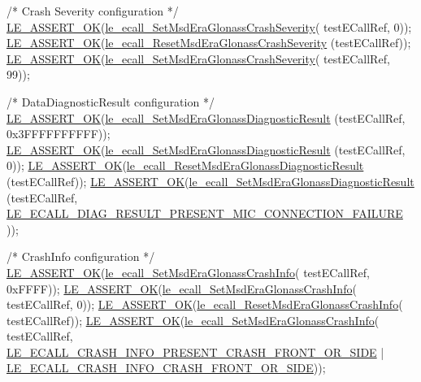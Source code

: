 \begin{DoxyCodeInclude}
    \textcolor{comment}{/* Crash Severity configuration */}
    \hyperlink{le__log_8h_a7cd2daa3d4af1de4d29e0eed95187484}{LE\_ASSERT\_OK}(\hyperlink{le__ecall__interface_8h_a577f3dcd16e53c8a14295ec58c6d2b9a}{le\_ecall\_SetMsdEraGlonassCrashSeverity}(
      testECallRef, 0));
    \hyperlink{le__log_8h_a7cd2daa3d4af1de4d29e0eed95187484}{LE\_ASSERT\_OK}(\hyperlink{le__ecall__interface_8h_addb2874aacaffba2731354c4ac9428bf}{le\_ecall\_ResetMsdEraGlonassCrashSeverity}
      (testECallRef));
    \hyperlink{le__log_8h_a7cd2daa3d4af1de4d29e0eed95187484}{LE\_ASSERT\_OK}(\hyperlink{le__ecall__interface_8h_a577f3dcd16e53c8a14295ec58c6d2b9a}{le\_ecall\_SetMsdEraGlonassCrashSeverity}(
      testECallRef, 99));

    \textcolor{comment}{/* DataDiagnosticResult configuration */}
    \hyperlink{le__log_8h_a7cd2daa3d4af1de4d29e0eed95187484}{LE\_ASSERT\_OK}(\hyperlink{le__ecall__interface_8h_a51ad61edf379cfe07f03fbd71b56df9d}{le\_ecall\_SetMsdEraGlonassDiagnosticResult}
      (testECallRef, 0x3FFFFFFFFFF));
    \hyperlink{le__log_8h_a7cd2daa3d4af1de4d29e0eed95187484}{LE\_ASSERT\_OK}(\hyperlink{le__ecall__interface_8h_a51ad61edf379cfe07f03fbd71b56df9d}{le\_ecall\_SetMsdEraGlonassDiagnosticResult}
      (testECallRef, 0));
    \hyperlink{le__log_8h_a7cd2daa3d4af1de4d29e0eed95187484}{LE\_ASSERT\_OK}(\hyperlink{le__ecall__interface_8h_ad3e06b90843a480d68dc99ead29ae8d0}{le\_ecall\_ResetMsdEraGlonassDiagnosticResult}
      (testECallRef));
    \hyperlink{le__log_8h_a7cd2daa3d4af1de4d29e0eed95187484}{LE\_ASSERT\_OK}(\hyperlink{le__ecall__interface_8h_a51ad61edf379cfe07f03fbd71b56df9d}{le\_ecall\_SetMsdEraGlonassDiagnosticResult}
      (testECallRef,
                 \hyperlink{le__ecall__interface_8h_a777e8d6608b5e40f73696904471519cfa3a666c50c2a85411eb7d723a9553144e}{LE\_ECALL\_DIAG\_RESULT\_PRESENT\_MIC\_CONNECTION\_FAILURE}
      ));

    \textcolor{comment}{/* CrashInfo configuration */}
    \hyperlink{le__log_8h_a7cd2daa3d4af1de4d29e0eed95187484}{LE\_ASSERT\_OK}(\hyperlink{le__ecall__interface_8h_a08c613df57d34eb2a1309738bced5d76}{le\_ecall\_SetMsdEraGlonassCrashInfo}(
      testECallRef, 0xFFFF));
    \hyperlink{le__log_8h_a7cd2daa3d4af1de4d29e0eed95187484}{LE\_ASSERT\_OK}(\hyperlink{le__ecall__interface_8h_a08c613df57d34eb2a1309738bced5d76}{le\_ecall\_SetMsdEraGlonassCrashInfo}(
      testECallRef, 0));
    \hyperlink{le__log_8h_a7cd2daa3d4af1de4d29e0eed95187484}{LE\_ASSERT\_OK}(\hyperlink{le__ecall__interface_8h_ab883aa41416ada9746acfbb75a0039a8}{le\_ecall\_ResetMsdEraGlonassCrashInfo}(
      testECallRef));
    \hyperlink{le__log_8h_a7cd2daa3d4af1de4d29e0eed95187484}{LE\_ASSERT\_OK}(\hyperlink{le__ecall__interface_8h_a08c613df57d34eb2a1309738bced5d76}{le\_ecall\_SetMsdEraGlonassCrashInfo}(
      testECallRef,
                 \hyperlink{le__ecall__interface_8h_ae95239490ffd1ee40a9dfcfe02cbd318a7139e97473edb9bca67b01d3d4f6d5c9}{LE\_ECALL\_CRASH\_INFO\_PRESENT\_CRASH\_FRONT\_OR\_SIDE}
       |
                 \hyperlink{le__ecall__interface_8h_ae95239490ffd1ee40a9dfcfe02cbd318a0e26e57771f2628a39f1c88a5ef08f1b}{LE\_ECALL\_CRASH\_INFO\_CRASH\_FRONT\_OR\_SIDE}));


\end{DoxyCodeInclude}
